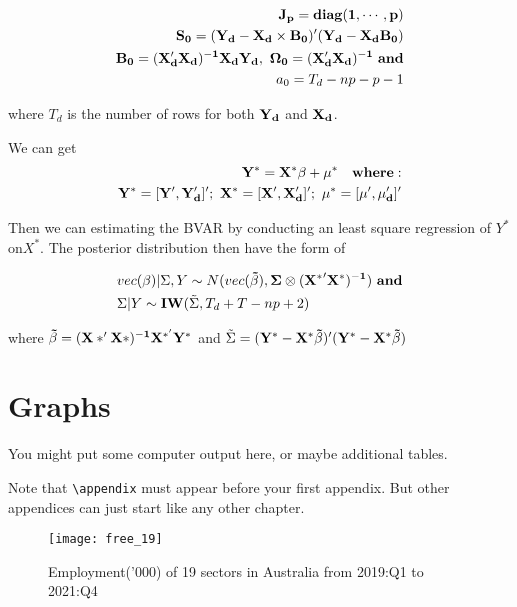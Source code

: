 \documentclass{monashthesis}
\begin{document}
\[
\begin{aligned}
\bf{J_p}=diag(1,\cdots,p)\\
\bf{S_0}=(Y_d-X_d\times B_0)'(Y_d-X_dB_0)\\
\bf{B_0}=(X_d'X_d)^{-1}X_dY_d,\ \Omega_0=(X_d'X_d)^{-1}\  and\\
a_0=T_d-np-p-1\\
\end{aligned}
\]

where \(T_d\) is the number of rows for both \(\bf{Y}_d\) and \(\bf{X}_d\).

We can get
\begin{align}
\bf{Y^*}=\bf{X^*}\bf{\beta}+\bf{\mu}^*\ \ \  where: \\
\bf{Y^*}=[\bf{Y'},\bf{Y'_d}]';\ \bf{X^*}=[\bf{X'},\bf{X'_d}]';\ \bf{\mu^*}=[\bf{\mu'},\bf{\mu'_d}]'
\end{align}

Then we can estimating the BVAR by conducting an least square regression of \(Y^*\) on\(X^*\). The posterior distribution then have the form of

\begin{align}
&vec(\mathbf{\beta})|\Sigma,Y\sim N(vec(\bf{\tilde\beta}),\Sigma\otimes(\bf{X^*}'\bf{X^*})^{-1})\ and\\
&\Sigma|Y\sim\mathbf{IW}(\tilde\Sigma,T_d+T-np+2)
\end{align}

where \(\bf{\tilde\beta} =(X*'X*)^{-1}X^{*'}Y^*\) and \(\tilde\Sigma=(\bf{Y^*}-\bf{X^*}\bf{\tilde\beta})'(\bf{Y^*}-\bf{X^*}\bf{\tilde\beta})\)

\newpage

\hypertarget{graphs}{%
\chapter{Graphs}\label{graphs}}

You might put some computer output here, or maybe additional tables.

Note that \texttt{\textbackslash{}appendix} must appear before your first appendix. But other appendices can just start like any other chapter.

\graphicspath{ {/Users/elvisyang/Desktop/hon_proj/Disaggregated_Employment/Honours_thesis/figures} }

\begin{figure}[t]
\texttt{[image: free\_19]}
\centering
\caption{Employment('000) of 19 sectors in Australia from 2019:Q1 to 2021:Q4}
\label{fig:19}
\end{figure}
\end{document}
